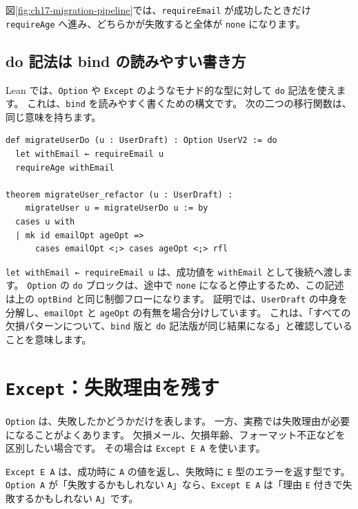 図\ref{fig:ch17-migration-pipeline}では、\texttt{requireEmail} が成功したときだけ \texttt{requireAge} へ進み、どちらかが失敗すると全体が \texttt{none} になります。


\subsection{do 記法は bind の読みやすい書き方}

Lean では、\texttt{Option} や \texttt{Except} のようなモナド的な型に対して \texttt{do} 記法を使えます。
これは、\texttt{bind} を読みやすく書くための構文です。
次の二つの移行関数は、同じ意味を持ちます。

\begin{listing}[htbp]
\begin{verbatim}
def migrateUserDo (u : UserDraft) : Option UserV2 := do
  let withEmail ← requireEmail u
  requireAge withEmail

theorem migrateUser_refactor (u : UserDraft) :
    migrateUser u = migrateUserDo u := by
  cases u with
  | mk id emailOpt ageOpt =>
      cases emailOpt <;> cases ageOpt <;> rfl
\end{verbatim}
\caption{\texttt{migrateUser\_refactor}}
\label{lst:ch17_do_notation}
\end{listing}

\texttt{let withEmail ← requireEmail u} は、成功値を \texttt{withEmail} として後続へ渡します。
\texttt{Option} の \texttt{do} ブロックは、途中で \texttt{none} になると停止するため、この記述は上の \texttt{optBind} と同じ制御フローになります。
証明では、\texttt{UserDraft} の中身を分解し、\texttt{emailOpt} と \texttt{ageOpt} の有無を場合分けしています。
これは、「すべての欠損パターンについて、\texttt{bind} 版と \texttt{do} 記法版が同じ結果になる」と確認していることを意味します。

\section{\texttt{Except}：失敗理由を残す}

\texttt{Option} は、失敗したかどうかだけを表します。
一方、実務では失敗理由が必要になることがよくあります。
欠損メール、欠損年齢、フォーマット不正などを区別したい場合です。
その場合は \texttt{Except E A} を使います。

\texttt{Except E A} は、成功時に \texttt{A} の値を返し、失敗時に \texttt{E} 型のエラーを返す型です。
\texttt{Option A} が「失敗するかもしれない \texttt{A}」なら、\texttt{Except E A} は「理由 \texttt{E} 付きで失敗するかもしれない \texttt{A}」です。

